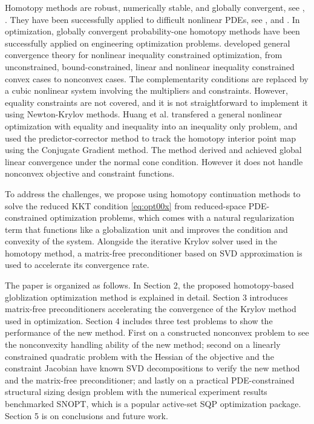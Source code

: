 \documentclass{article}
\theoremstyle{definition}
\begin{document}
Homotopy methods are robust, numerically stable, and globally convergent, see \cite{allgower_georg_1993}, \cite{Watson_1989}. They have been successfully applied to difficult nonlinear PDEs, see \cite{hicken:cfd2009, hicken:cfd2011b}, and \cite{Brown_2016}.  In optimization, globally convergent probability-one homotopy methods have been successfully applied on engineering optimization problems. \cite{Watson_2001} developed general convergence theory for nonlinear inequality constrained optimization, from unconstrained, bound-constrained, linear and nonlinear inequality constrained convex cases to nonconvex cases. The complementarity conditions are replaced by a cubic nonlinear system involving the multipliers and constraints. However, equality constraints are not covered, and it is not straightforward to implement it using Newton-Krylov methods. Huang et al. \cite{huang_2012pc} transfered a general nonlinear optimization with equality and inequality into an inequality only problem, and used the predictor-corrector method to track the homotopy interior point map using the Conjugate Gradient method. The method derived and achieved global linear convergence under the normal cone condition. However it does not handle nonconvex objective and constraint functions. 

To address the challenges, we propose using homotopy continuation methods to solve the reduced KKT condition \eqref{eq:opt00x} from reduced-space PDE-constrained optimization problems, which comes with a natural regularization term that functions like a globalization unit and improves the condition and convexity of the system. Alongside the iterative Krylov solver used in the homotopy method, a matrix-free preconditioner based on SVD approximation is used to accelerate its convergence rate. 

The paper is organized as follows. In Section 2, the proposed homotopy-based globlization optimization method is explained in detail. Section 3 introduces matrix-free preconditioners accelerating the convergence of the Krylov method used in optimization. Section 4 includes three test problems to show the performance of the new method. First on a constructed nonconvex problem to see the nonconvexity handling ability of the new method; second on a linearly constrained quadratic problem with the Hessian of the objective and the constraint Jacobian have known SVD decompositions to verify the new method and the matrix-free preconditioner; and lastly on a practical PDE-constrained structural sizing design problem with the numerical experiment results benchmarked SNOPT, which is a popular active-set SQP optimization package. Section 5 is on conclusions and future work.      
\end{document}
